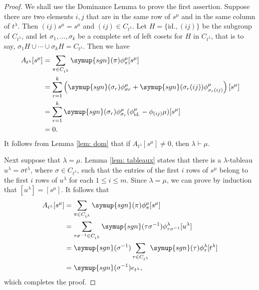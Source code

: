 \documentclass{assignment}[2019/10/15]
\newcommand{\lr}[3]{\left#1#3\right#2}
\theoremstyle{plain}
\newcommand{\sgn}{\mathop{}\!\symup{sgn}}
\newcommand{\id}{\text{id.}}
\begin{document}
    \begin{proof}
        We shall use the Dominance Lemma to prove the first assertion. Suppose there are two elements $i, j$ that are in the same row of $s^\mu$ and in the same column of $t^\lambda$. Then $(i j)s^\mu = s^\mu$ and $(i j)\in C_{t^\lambda}$. Let $H=\{\id, (i j)\}$ be the subgroup of $C_{t^\lambda}$, and let $\sigma_1, \dotsc, \sigma_k$ be a complete set of left cosets for $H$ in $C_{t^\lambda}$, that is to say, $\sigma_1H\cup\dotsb \cup \sigma_kH = C_{t^\lambda}$. Then we have
        \begin{equation}
            \begin{aligned}
                A_{t^\lambda}[s^\mu] &= \sum_{\pi\in C_{t^\lambda}}\sgn(\pi)\phi_\pi^\mu[s^\mu]\\
                &= \sum_{r=1}^k \lr(){\sgn(\sigma_r)\phi_{\sigma r}^\mu + \sgn(\sigma_r(i j))\phi_{\sigma_r(i j)}^\mu}[s^\mu]\\
                &= \sum_{r=1}^k\sgn(\sigma_r)\phi_{\sigma_r}^\mu(\phi_\id^\mu-\phi_{(i j)}\mu)[s^\mu]\\
                &= 0.
            \end{aligned}
        \end{equation}
        It follows from Lemma \ref{lem: dom} that if $A_{t^\lambda}[s^\mu]\neq 0$, then $\lambda\vdash\mu$.

        Next suppose that $\lambda=\mu$. Lemma \ref{lem: tableaux} states that there is a $\lambda$-tableau $u^\lambda = \sigma t^\lambda$, where $\sigma\in C_{t^\lambda}$, such that the entries of the first $i$ rows of $s^\mu$ belong to the first $i$ rows of $u^\lambda$ for each $1\leq i\leq m$. Since $\lambda=\mu$, we can prove by induction that $[u^\lambda]=[s^\mu]$. It follows that
        \begin{equation}
            \begin{aligned}
                A_{t^\lambda}[s^\mu]
                &= \sum_{\pi\in C_{t^\lambda}}\sgn(\pi)\phi_\pi^\mu[s^\mu]\\
                &= \sum_{\tau\sigma^{-1}\in C_{t^\lambda}}\sgn(\tau\sigma^{-1})\phi_{\tau\sigma^{-1}}^\lambda[u^\lambda]\\
                &= \sgn(\sigma^{-1})\sum_{\tau\in C_{t^\lambda}}\sgn(\tau)\phi_\tau^\lambda[t^\lambda]\\
                &= \sgn(\sigma^{-1})e_{t^\lambda},
            \end{aligned}
        \end{equation}
        which completes the proof.
    \end{proof}
\end{document}

